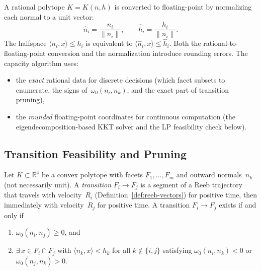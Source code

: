 \begin{remark}%
\label{rem:f64-conversion}
A rational polytope $K = K(n, h)$ is converted to
floating-point by normalizing each normal to a unit
vector:
\[
  \hat n_i = \frac{n_i}{\|n_i\|}, \qquad
  \hat h_i = \frac{h_i}{\|n_i\|}.
\]
The halfspace $\langle n_i, x \rangle \leq h_i$ is
equivalent to
$\langle \hat n_i, x \rangle \leq \hat h_i$.
Both the rational-to-floating-point conversion
and the normalization introduce rounding errors.
The capacity algorithm uses:
\begin{itemize}
\item the \emph{exact} rational data for discrete
  decisions (which facet subsets to enumerate,
  the signs of~$\omega_0(n_i, n_k)$,
  and the exact part of transition pruning),
\item the \emph{rounded} floating-point coordinates
  for continuous computation (the eigendecomposition-based
  KKT solver and the LP feasibility check below).
\end{itemize}
\end{remark}


\subsection{Transition Feasibility and Pruning}\label{app:pruning}


\begin{lemma}%
\label{lem:numerical-transition-feasibility}
Let $K \subset \mathbb{R}^4$ be a convex polytope with
facets $F_1, \ldots, F_m$ and outward normals~$n_k$
(not necessarily unit).
A \emph{transition} $F_i \to F_j$ is a segment of a
Reeb trajectory that travels with velocity~$R_i$
(Definition~\ref{def:reeb-vectors}) for positive time,
then immediately with velocity~$R_j$ for positive time.
A transition $F_i \to F_j$ exists if and only if
\begin{enumerate}
\item $\omega_0(n_i, n_j) \ge 0$, and
\item $\exists\, x \in F_i \cap F_j$ with
  $\langle n_k, x \rangle < h_k$
  for all $k \notin \{i,j\}$ satisfying
  $\omega_0(n_i, n_k) < 0$ or
  $\omega_0(n_j, n_k) > 0$.
\end{enumerate}
\end{lemma}

